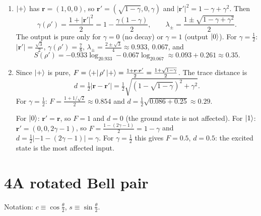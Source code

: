 \documentclass[11pt,a4paper]{article}
\newcommand{\id}{\mathbb{I}}
\begin{document}
\begin{enumerate}
For $\rho=\id/2$ ($\bm r=\bm0$): $\bm r'=(0,0,\gamma)$, so $\rho'=\frac12(\id+\gamma\sigma_z)\neq\id/2$.
The purity increases from $\frac12$ to $\frac{1+\gamma^2}2$. The Pauli channels only shrink the Bloch
vector ($|2p-1|\le1$) and leave $\id/2$ unchanged (they are unital), so they never increase the
purity. The amplitude damping channel is not unital: it drives the system towards a pure state by
releasing energy (and entropy) to the environment.

\item $\ket+$ has $\bm r=(1,0,0)$, so $\bm r'=(\sqrt{1-\gamma},0,\gamma)$ and
$|\bm r'|^2=1-\gamma+\gamma^2$. Then
\[
\gamma(\rho')=\frac{1+|\bm r'|^2}{2}=1-\frac{\gamma(1-\gamma)}2,\qquad
\lambda_\pm=\frac{1\pm\sqrt{1-\gamma+\gamma^2}}{2}.
\]
The output is pure only for $\gamma=0$ (no decay) or $\gamma=1$ (output $\ket0$). For $\gamma=\frac12$:
$|\bm r'|=\frac{\sqrt3}2$, $\gamma(\rho')=\frac78$, $\lambda_\pm=\frac{2\pm\sqrt3}{4}\approx0.933,\ 0.067$, and
\[
S(\rho')=-0.933\log_20.933-0.067\log_20.067\approx0.093+0.261\approx0.35 .
\]

\item Since $\ket+$ is pure, $F=\bra+\rho'\ket+=\frac{1+\bm r\cdot\bm r'}2=\frac{1+\sqrt{1-\gamma}}{2}$. The
trace distance is
\[
d=\tfrac12|\bm r-\bm r'|=\tfrac12\sqrt{\left(1-\sqrt{1-\gamma}\right)^2+\gamma^2}.
\]
For $\gamma=\frac12$: $F=\frac{1+1/\sqrt2}2\approx0.854$ and $d=\frac12\sqrt{0.086+0.25}\approx0.29$.

For $\ket0$: $\bm r'=\bm r$, so $F=1$ and $d=0$ (the ground state is not affected). For $\ket1$:
$\bm r'=(0,0,2\gamma-1)$, so $F=\frac{1-(2\gamma-1)}2=1-\gamma$ and $d=\frac12|{-1}-(2\gamma-1)|=\gamma$.
For $\gamma=\frac12$ this gives $F=0.5$, $d=0.5$: the excited state is the most affected input.
\end{enumerate}

\section*{4\quad A rotated Bell pair}

Notation: $c\equiv\cos\frac\theta2$, $s\equiv\sin\frac\theta2$.
\end{document}
